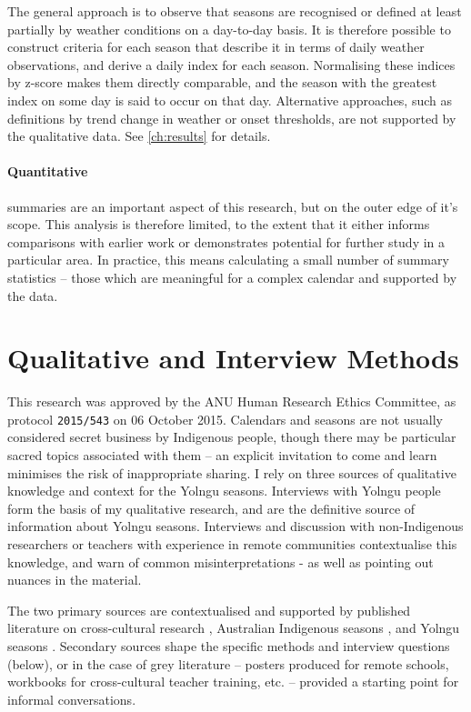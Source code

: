 The general approach is to observe that seasons are recognised or defined
at least partially by weather conditions on a day-to-day basis.  It is
therefore possible to construct criteria for each season that describe
it in terms of daily weather observations, and derive a daily index for
each season.  Normalising these indices by z-score makes them directly
comparable, and the season with the greatest index on some day is said
to occur on that day.
%
Alternative approaches, such as definitions by trend change in weather
or onset thresholds, are not supported by the qualitative data.  See
\cref{ch:results} for details.


\paragraph{Quantitative} summaries are an important aspect of this
research, but on the outer edge of it's scope.  This analysis is therefore
limited, to the extent that it either informs comparisons with earlier work
or demonstrates potential for further study in a particular area.
%
In practice, this means calculating a small number of summary statistics
-- those which are meaningful for a complex calendar and supported by the
data.



\section{Qualitative and Interview Methods}

This research was approved by the ANU Human Research Ethics Committee,
as protocol \texttt{2015/543} on 06 October 2015.
Calendars and seasons are not usually considered secret business by Indigenous people, though
there may be particular sacred topics associated with them -- an explicit
invitation to come and learn minimises the risk of inappropriate sharing.
I rely on three sources of qualitative knowledge and context for the Yolngu
seasons.  Interviews with Yolngu people form the basis of my qualitative
research, and are the definitive source of information about Yolngu seasons.
Interviews and discussion with non-Indigenous researchers or teachers with
experience in remote communities contextualise this knowledge, and warn of
common misinterpretations - as well as pointing out nuances in the material.

The two primary sources are contextualised and supported by published
literature on cross-cultural research \citep[eg.][]{smith1999}, Australian
Indigenous seasons \citep[eg.][]{prober2011,oconnor2010}, and Yolngu seasons
\citep{davis1989,atlas2014}.  Secondary sources shape the specific methods
and interview questions (below), or in the case of grey literature --
posters produced for remote schools, workbooks for cross-cultural teacher
training, etc. -- provided a starting point for informal conversations.


